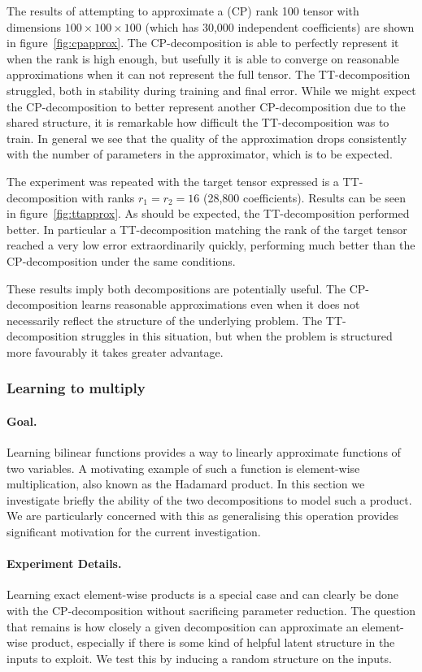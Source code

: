 The results of attempting to approximate a (CP) rank 100 tensor with dimensions 
\(100 \times 100 \times 100\) (which has 30,000 independent coefficients) 
are shown in figure~\ref{fig:cpapprox}.
The CP-decomposition is able to perfectly represent it when the rank is high enough,
but usefully it is able to converge on reasonable approximations when it can not
represent the full tensor.
The TT-decomposition struggled, both in stability during training and final error.
While we might expect the CP-decomposition to better represent another CP-decomposition due to
the shared structure, it is remarkable how difficult the TT-decomposition was to
train.
In general we see that the quality of the approximation drops consistently with the
number of parameters in the approximator, which is to be expected.

The experiment was repeated with the target tensor expressed is a TT-decomposition with ranks
\(r_1 = r_2 = 16\) (28,800 coefficients). Results can be seen in figure~\ref{fig:ttapprox}.
As should be expected, the TT-decomposition performed better. In particular a TT-decomposition
matching the rank of the target tensor reached a very low error extraordinarily quickly,
performing much better than the CP-decomposition under the same conditions.

These results imply both decompositions are potentially useful. The CP-decomposition learns
 reasonable approximations even when it does not necessarily reflect the
structure of the underlying problem. The TT-decomposition struggles in this situation,
but when the problem is structured more favourably it takes greater advantage.

\subsubsection{Learning to multiply}
\paragraph{Goal.}
Learning bilinear functions provides a way to linearly approximate functions of two variables.
A motivating example of such a function is element-wise multiplication, also known as the Hadamard
product. In this section we investigate briefly the ability of the two decompositions to model
such a product. We are particularly concerned with this as generalising this operation provides
significant motivation for the current investigation.

\paragraph{Experiment Details.}
Learning exact element-wise products is a special case and can clearly be done with the 
CP-decomposition without sacrificing parameter reduction. The question that remains is how closely
a given decomposition can approximate an element-wise product, especially if there is some kind of
helpful latent structure in the inputs to exploit. We test this by inducing a random structure
on the inputs.

